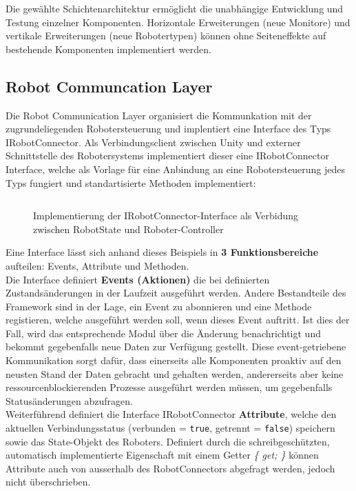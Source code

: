 Die gewählte Schichtenarchitektur ermöglicht die unabhängige Entwicklung und
Testung einzelner Komponenten. Horizontale Erweiterungen (neue Monitore) und
vertikale Erweiterungen (neue Robotertypen) können ohne Seiteneffekte auf
bestehende Komponenten implementiert werden.

\subsection{Robot Communcation Layer}
Die Robot Communication Layer organisiert die Kommunkation mit der zugrundeliegenden Robotersteuerung und
implentiert eine Interface des Typs IRobotConnector. Als Verbindungsclient
zwischen Unity und externer Schnittstelle des Robotersystems implementiert
dieser eine IRobotConnector Interface, welche als Vorlage für eine Anbindung an
eine Robotersteuerung jedes Typs fungiert und standartisierte Methoden
implementiert:

\begin{figure}[H]
	\inputminted[fontsize=\footnotesize]{csharp}{code-snippets/IRobotConnector.cs}
	\caption{Implementierung der IRobotConnector-Interface als Verbidung zwischen
		RobotState und Roboter-Controller}
\end{figure}
\noindent
Eine Interface lässt sich anhand dieses Beispiels in \textbf{3
	Funktionsbereiche} aufteilen: Events, Attribute und Methoden.\\

\noindent
Die Interface definiert \textbf{Events (Aktionen)} die bei definierten Zustandsänderungen
in der Laufzeit ausgeführt werden. Andere Bestandteile des Framework sind in der
Lage, ein Event zu abonnieren und eine Methode registieren, welche ausgeführt
werden soll, wenn dieses Event auftritt. Ist dies der Fall, wird das
entsprechende Modul über die Änderung benachrichtigt und bekommt gegebenfalls
neue Daten zur Verfügung gestellt. Diese event-getriebene Kommunikation sorgt
dafür, dass einerseits alle Komponenten proaktiv auf den neusten Stand der Daten gebracht
und gehalten werden, andererseits aber keine ressourcenblockierenden Prozesse
ausgeführt werden müssen, um gegebenfalls Statusänderungen abzufragen.\\

\noindent
Weiterführend definiert die Interface IRobotConnector \textbf{Attribute}, welche den
aktuellen Verbindungsstatus (verbunden = \texttt{true}, getrennt = \texttt{false}) speichern sowie das
State-Objekt des Roboters. Definiert durch die schreibgeschützten, automatisch
implementierte Eigenschaft mit einem Getter \textit{\{ get; \}} können Attribute
auch von ausserhalb des RobotConnectors abgefragt werden, jedoch nicht
überschrieben.\\

